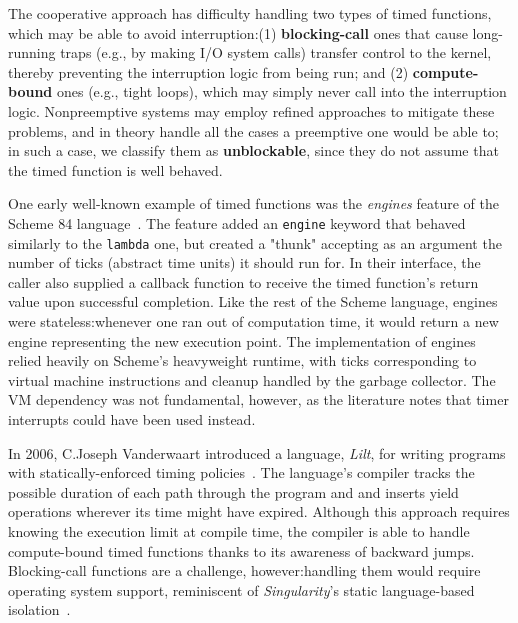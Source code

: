 

The cooperative approach has difficulty handling two types of timed functions, which
may be able to avoid interruption:\@ (1) \textbf{blocking-call} ones that cause
long-running traps (e.g., by making I/O system calls) transfer control to the kernel,
thereby preventing the interruption logic from being run; and (2)
\textbf{compute-bound} ones (e.g., tight loops), which may simply never call into the
interruption logic.  Nonpreemptive systems may employ refined approaches to mitigate
these problems, and in theory handle all the cases a preemptive one would be able to;
in such a case, we classify them as \textbf{unblockable}, since they do not assume
that the timed function is well behaved.

One early well-known example of timed functions was the \textit{engines} feature of
the Scheme 84 language~\cite{haynes:iucs1984}.  The feature added an \texttt{engine}
keyword that behaved similarly to the \texttt{lambda} one, but created a "thunk"
accepting as an argument the number of ticks (abstract time units) it should run for.
In their interface, the caller also supplied a callback function to receive the
timed function's return value upon successful completion.  Like the rest of the
Scheme language, engines were stateless:\@ whenever one ran out of computation time,
it would return a new engine representing the new execution point.  The
implementation of engines relied heavily on Scheme's heavyweight runtime, with ticks
corresponding to virtual machine instructions and cleanup handled by the garbage
collector.  The VM dependency was not fundamental, however, as the literature notes
that timer interrupts could have been used instead.

In 2006, C.\@ Joseph Vanderwaart introduced a language, \textit{Lilt}, for writing
programs with statically-enforced timing policies~\cite{vanderwaart:cmucs2006}.  The
language's compiler tracks the possible duration of each path through the program and
and inserts yield operations wherever its time might have expired.  Although this
approach requires knowing the execution limit at compile time, the compiler is able
to handle compute-bound timed functions thanks to its awareness of backward jumps.
Blocking-call functions are a challenge, however:\@ handling them would require
operating system support, reminiscent of \textit{Singularity}'s static language-based
isolation~\cite{hunt:msr2005}.

